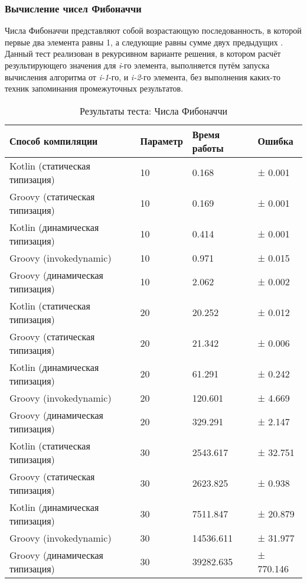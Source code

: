 \subsubsection{Вычисление чисел Фибоначчи}

Числа Фибоначчи представляют собой возрастающую последованность, в которой первые два элемента равны 1, а следующие равны сумме двух предыдущих \cite{math:vilenkin1969Combinatorics}. Данный тест реализован в рекурсивном варианте решения, в котором расчёт результирующего значения для \textit{i}-го элемента, выполняется путём запуска вычисления алгоритма от \textit{i-1}-го, и \textit{i-2}-го элемента, без выполнения каких-то техник запоминания промежуточных результатов.

\begin{table}[h]
\caption{\label{tab:fibBenchResults}Результаты теста: Числа Фибоначчи}
\begin{center}
\begin{tabular}{|l|l|l|l|}
\hline
Способ компиляции & Параметр & Время работы & Ошибка \\
\hline
Kotlin (статическая типизация)           & 10  &     0.168 & ±   0.001  \\
Groovy (статическая типизация)           & 10  &     0.169 & ±   0.001  \\
Kotlin (динамическая типизация)          & 10  &     0.414 & ±   0.001  \\
Groovy (invokedynamic)                   & 10  &     0.971 & ±   0.015  \\
Groovy (динамическая типизация)          & 10  &     2.062 & ±   0.002  \\
Kotlin (статическая типизация)           & 20  &    20.252 & ±   0.012  \\
Groovy (статическая типизация)           & 20  &    21.342 & ±   0.006  \\
Kotlin (динамическая типизация)          & 20  &    61.291 & ±   0.242  \\
Groovy (invokedynamic)                   & 20  &   120.601 & ±   4.669  \\
Groovy (динамическая типизация)          & 20  &   329.291 & ±   2.147  \\
Kotlin (статическая типизация)           & 30  &  2543.617 & ±  32.751  \\
Groovy (статическая типизация)           & 30  &  2623.825 & ±   0.938  \\
Kotlin (динамическая типизация)          & 30  &  7511.847 & ±  20.879  \\
Groovy (invokedynamic)                   & 30  & 14536.611 & ±  31.977  \\
Groovy (динамическая типизация)          & 30  & 39282.635 & ± 770.146  \\
\hline
\end{tabular}
\end{center}
\end{table} 


